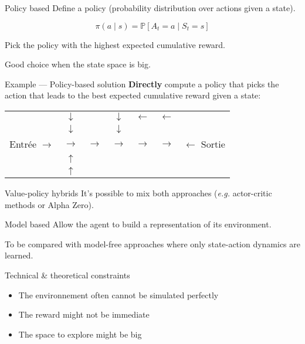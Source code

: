 \begin{frame}{Policy based}
  Define a policy (probability distribution over actions given a state).

  \[
    \pi(a \mid s) = \mathbb{P}[A_t = a \mid S_t = s]
  \]

  Pick the policy with the highest expected cumulative reward.

  Good choice when the state space is big.
\end{frame}

\begin{frame}{Example --- Policy-based solution}
  \textbf{Directly} compute a policy that picks the action that leads to the best expected cumulative reward given a state:

  \begin{tabular}{c|c|c|c|c|c|c}
    \cline{2-6}
      & $\downarrow$ & \cellcolor{black} & $\downarrow$ & $\leftarrow$ & $\leftarrow$ & \\
      \cline{2-6}
      & $\downarrow$ & \cellcolor{black} & $\downarrow$ & \cellcolor{black} & \cellcolor{black} & \\
      \cline{2-6}
      Entrée $\rightarrow$ & $\rightarrow$ & $\rightarrow$ & $\rightarrow$ & $\rightarrow$ & $\rightarrow$ & $\leftarrow$ Sortie \\
      \cline{2-6}
      & $\uparrow$ & \cellcolor{black} & \cellcolor{black} & \cellcolor{black} & \cellcolor{black} & \\
      \cline{2-6}
      & $\uparrow$ & \cellcolor{black} & \cellcolor{black} & \cellcolor{black} & \cellcolor{black} & \\
      \cline{2-6}
  \end{tabular}
\end{frame}

\begin{frame}{Value-policy hybrids}
  It's possible to mix both approaches (\textit{e.g.} actor-critic methods or Alpha Zero).
\end{frame}

\begin{frame}{Model based}
  Allow the agent to build a representation of its environment.

  To be compared with model-free approaches where only state-action dynamics are learned.
\end{frame}

\begin{frame}{Technical \& theoretical constraints}
  \begin{itemize}[<+->]
    \item The environnement often cannot be simulated perfectly 
    \item The reward might not be immediate
    \item The space to explore might be big
  \end{itemize}
\end{frame}


